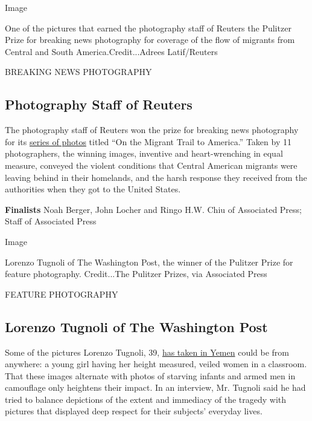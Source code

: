 Image

One of the pictures that earned the photography staff of Reuters the
Pulitzer Prize for breaking news photography for coverage of the flow of
migrants from Central and South America.Credit...Adrees Latif/Reuters

BREAKING NEWS PHOTOGRAPHY

\hypertarget{photography-staff-of-reuters}{%
\subsection{Photography Staff of
Reuters}\label{photography-staff-of-reuters}}

The photography staff of Reuters won the prize for breaking news
photography for its
\href{https://www.reuters.com/news/picture/reuters-wins-pulitzer-prize-for-migrant-idUSRTX6RS1A}{series
of photos} titled ``On the Migrant Trail to America.'' Taken by 11
photographers, the winning images, inventive and heart-wrenching in
equal measure, conveyed the violent conditions that Central American
migrants were leaving behind in their homelands, and the harsh response
they received from the authorities when they got to the United States.

\textbf{Finalists} Noah Berger, John Locher and Ringo H.W. Chiu of
Associated Press; Staff of Associated Press

Image

Lorenzo Tugnoli of The Washington Post, the winner of the Pulitzer Prize
for feature photography. Credit...The Pulitzer Prizes, via Associated
Press

FEATURE PHOTOGRAPHY

\hypertarget{lorenzo-tugnoli-of-the-washington-post}{%
\subsection{Lorenzo Tugnoli of The Washington
Post}\label{lorenzo-tugnoli-of-the-washington-post}}

Some of the pictures Lorenzo Tugnoli, 39,
\href{https://www.washingtonpost.com/graphics/2018/world/amp-stories/photos-of-war-in-yemen/}{has
taken in Yemen} could be from anywhere: a young girl having her height
measured, veiled women in a classroom. That these images alternate with
photos of starving infants and armed men in camouflage only heightens
their impact. In an interview, Mr. Tugnoli said he had tried to balance
depictions of the extent and immediacy of the tragedy with pictures that
displayed deep respect for their subjects' everyday lives.

